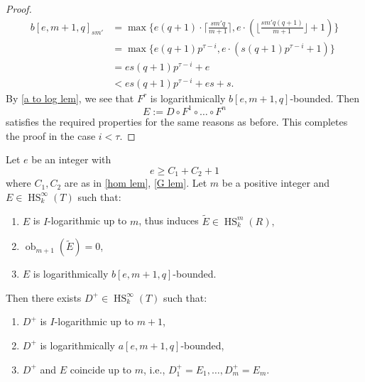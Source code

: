 \documentclass{amsart}
\newcommand{\HS}{\operatorname{HS}}
\begin{document}
\begin{proof}
    \begin{align*}
   b[e,m+1,q]_{sm'}& =\max\{ e(q+1)\cdot \lceil \frac{sm'q}{m+1} \rceil,e\cdot (\lfloor \frac{sm'q(q+1)}{m+1} \rfloor+1)\}\\
   &=\max\{ e(q+1)p^{\tau-i},e\cdot (s(q+1)p^{\tau-i}+1)\}\\
   &=es(q+1)p^{\tau-i}+e\\
   &<es(q+1)p^{\tau-i}+es+s.
    \end{align*}
    By \ref{a to log lem}, we see that $F^r$ is logarithmically $b[e,m+1,q]$-bounded. Then
    $$E:=D\circ F^1\circ\dots\circ F^n$$
    satisfies the required properties for the same reasons as before. This completes the proof in the case $i<\tau$.
\end{proof}

\begin{proposition}\label{b to a extension prop}
    Let $e$ be an integer with
    $$e\ge C_1+C_2+1$$
    where $C_1,C_2$ are as in \ref{hom lem}, \ref{G lem}. Let $m$ be a positive integer and $E\in \HS_k^\infty(T)$ such that:
         \begin{enumerate}
        \item $E$ is $I$-logarithmic up to $m$, thus induces $\widetilde{E}\in \HS_k^m(R),$
        \item $\operatorname{ob}_{m+1}(\widetilde{E})=0$,
        \item $E$ is logarithmically $b[e,m+1,q]$-bounded.
    \end{enumerate}
    Then there exists $D^+\in \HS_k^\infty (T)$ such that:
        \begin{enumerate}
        \item $D^+$ is $I$-logarithmic up to $m+1$,
        \item $D^+$ is logarithmically $a[e,m+1,q]$-bounded,
        \item $D^+$ and $E$ coincide up to $m$, i.e., $D^+_1=E_1,\dots,D^+_{m}=E_{m}$.
    \end{enumerate}
\end{proposition}
\end{document}
